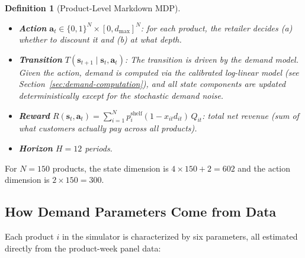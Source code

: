 \documentclass[12pt,a4paper]{article}
\newtheorem{definition}{Definition}
\begin{document}
\begin{definition}[Product-Level Markdown MDP]
\begin{itemize}[nosep]
\item \textbf{Action} $\mathbf{a}_t \in \{0,1\}^N \times
[0, d_{\max}]^N$: for each product, the retailer decides (a) whether
to discount it and (b) at what depth.

\item \textbf{Transition}
$T(\mathbf{s}_{t+1} \mid \mathbf{s}_t, \mathbf{a}_t)$:
The transition is driven by the demand model. Given the action, demand
is computed via the calibrated log-linear model (see
Section~\ref{sec:demand-computation}), and all state components are
updated deterministically except for the stochastic demand noise.

\item \textbf{Reward}
$R(\mathbf{s}_t, \mathbf{a}_t) = \sum_{i=1}^{N}
p_i^{\text{shelf}} (1 - x_{it} d_{it}) \, Q_{it}$:
total net revenue (sum of what customers actually pay across all
products).

\item \textbf{Horizon} $H = 12$ periods.
\end{itemize}
\end{definition}

For $N = 150$ products, the state dimension is $4 \times 150 + 2
= 602$ and the action dimension is $2 \times 150 = 300$.

\subsection{How Demand Parameters Come from Data}
\label{sec:param-origin}

Each product $i$ in the simulator is characterized by six parameters,
all estimated directly from the product-week panel data:
\end{document}
